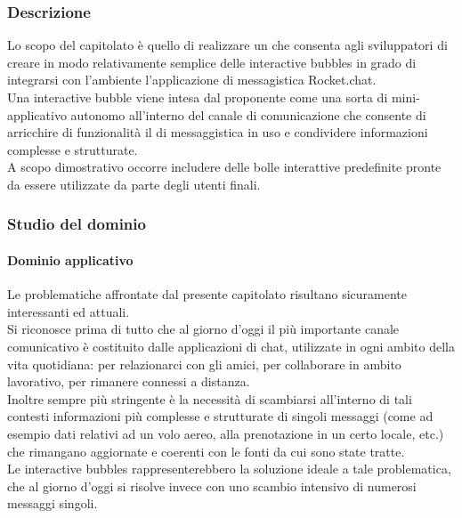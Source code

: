 		\subsubsection{Descrizione}
		Lo scopo del capitolato è quello di realizzare un  che consenta agli sviluppatori di creare in modo relativamente semplice delle 
		interactive bubbles in grado di integrarsi con l'ambiente l'applicazione di messagistica Rocket.chat.
		\\Una interactive bubble viene intesa dal proponente come una sorta di mini-applicativo autonomo all'interno del canale di comunicazione 
		che consente di arricchire di funzionalità il  di messaggistica in uso e condividere informazioni complesse e strutturate. 
		\\A scopo dimostrativo occorre includere delle bolle interattive predefinite pronte da essere utilizzate da parte degli utenti finali.
		
		\subsubsection{Studio del dominio}
			\paragraph{Dominio applicativo}
			Le problematiche affrontate dal presente capitolato risultano sicuramente interessanti ed attuali.
			\\Si riconosce prima di tutto che al giorno d'oggi il più importante canale comunicativo è costituito dalle applicazioni di chat, 
			utilizzate in ogni ambito della vita quotidiana: per relazionarci con gli amici, per collaborare in ambito lavorativo, per rimanere 
			connessi a distanza.
			\\Inoltre sempre più stringente è la necessità di scambiarsi all'interno di tali contesti informazioni più complesse e strutturate di singoli messaggi 
			(come ad esempio dati relativi ad un volo aereo, alla prenotazione in un certo locale, etc.) che rimangano aggiornate e coerenti con 
			le fonti da cui sono state tratte.
			\\Le interactive bubbles rappresenterebbero la soluzione ideale a tale problematica, che al giorno d'oggi si risolve invece con uno 
			scambio intensivo di numerosi messaggi singoli. 
